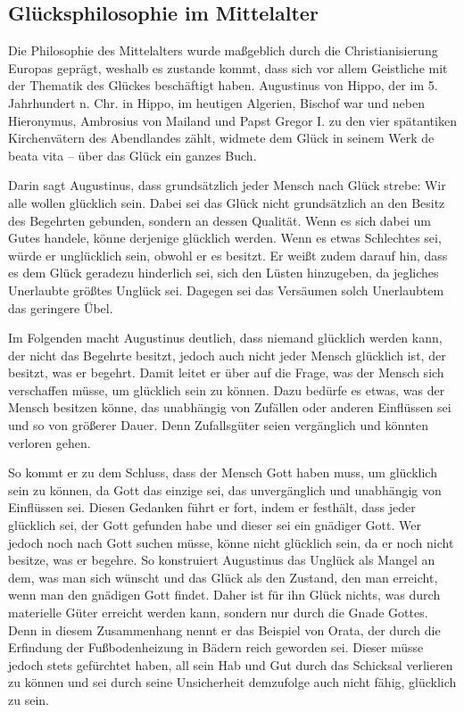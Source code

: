 \newpage

\subsection{Glücksphilosophie im Mittelalter}

Die Philosophie des Mittelalters wurde maßgeblich durch die Christianisierung Europas geprägt, weshalb es zustande kommt, dass sich vor allem Geistliche mit der Thematik des Glückes beschäftigt haben. 
Augustinus von Hippo, der im 5. Jahrhundert n. Chr. in Hippo, im heutigen Algerien, Bischof war und neben Hieronymus, Ambrosius von Mailand und Papst Gregor I. zu den vier spätantiken Kirchenvätern des Abendlandes zählt, widmete dem Glück in seinem Werk \glqq de beata vita -- über das Glück\grqq{} ein ganzes Buch.

Darin sagt Augustinus, dass grundsätzlich jeder Mensch nach Glück strebe: \glqq Wir alle wollen glücklich sein.\grqq{} \cite[S.\,21]{A82}
Dabei sei das Glück nicht grundsätzlich an den Besitz des Begehrten gebunden, sondern an dessen Qualität. 
Wenn es sich dabei um Gutes handele, könne derjenige glücklich werden. 
Wenn es etwas Schlechtes sei, würde er unglücklich sein, obwohl er es besitzt. 
Er weißt zudem darauf hin, dass es dem Glück geradezu hinderlich sei, sich den Lüsten hinzugeben, da jegliches Unerlaubte größtes Unglück sei\cite[S.\,21]{A82}.
Dagegen sei das Versäumen solch Unerlaubtem das geringere Übel.

Im Folgenden macht Augustinus deutlich, dass niemand glücklich werden kann, der nicht das Begehrte besitzt, jedoch auch nicht jeder Mensch glücklich ist, der besitzt, was er begehrt. 
Damit leitet er über auf die Frage, was der Mensch sich verschaffen müsse, um glücklich sein zu können\cite[S.\,23]{A82}.
Dazu bedürfe es etwas, was der Mensch besitzen könne, das unabhängig von Zufällen oder anderen Einflüssen sei und so von größerer Dauer. 
Denn Zufallsgüter seien vergänglich und könnten verloren gehen. 

So kommt er zu dem Schluss, dass der Mensch Gott haben muss, um glücklich sein zu können, da Gott das einzige sei, das unvergänglich und unabhängig von Einflüssen sei. 
Diesen Gedanken führt er fort, indem er festhält, dass jeder glücklich sei, der Gott gefunden habe und dieser sei ein gnädiger Gott\cite[S.\,41]{A82}. 
Wer jedoch noch nach Gott suchen müsse, könne nicht glücklich sein, da er noch nicht besitze, was er begehre. 
So konstruiert Augustinus das Unglück als Mangel an dem, was man sich wünscht und das Glück als den Zustand, den man erreicht, wenn man den gnädigen Gott findet. 
Daher ist für ihn Glück nichts, was durch materielle Güter erreicht werden kann, sondern nur durch die Gnade Gottes. 
Denn in diesem Zusammenhang nennt er das Beispiel von Orata, der durch die Erfindung der Fußbodenheizung in Bädern reich geworden sei. 
Dieser müsse jedoch stets gefürchtet haben, all sein Hab und Gut durch das Schicksal verlieren zu können und sei durch seine Unsicherheit demzufolge auch nicht fähig, glücklich zu sein\cite[S.\,48]{A82}.

